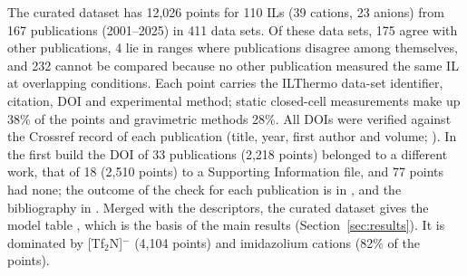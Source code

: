 The curated dataset has 12,026 points for 110 ILs (39 cations, 23 anions) from 167 publications (2001--2025) in 411 data sets. Of these data sets, 175 agree with other publications, 4 lie in ranges where publications disagree among themselves, and 232 cannot be compared because no other publication measured the same IL at overlapping conditions. Each point carries the ILThermo data-set identifier, citation, DOI and experimental method; static closed-cell measurements make up 38\% of the points and gravimetric methods 28\%. All DOIs were verified against the Crossref record of each publication (title, year, first author and volume; ). In the first build the DOI of 33 publications (2,218 points) belonged to a different work, that of 18 (2,510 points) to a Supporting Information file, and 77 points had none; the outcome of the check for each publication is in , and the bibliography in . Merged with the descriptors, the curated dataset gives the model table , which is the basis of the main results (Section~\ref{sec:results}). It is dominated by [Tf$_2$N]$^-$ (4,104 points) and imidazolium cations (82\% of the points).
